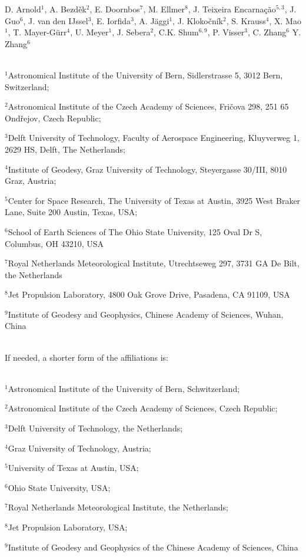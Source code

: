 \documentclass[11pt,a4paper,oneside]{article}
\begin{document}
D. Arnold$^1$, %
A. Bezd\v{e}k$^2$, %
E. Doornbos$^7$, %
M. Ellmer$^8$, %
J. Teixeira Encarna\c c\~ao$^{5,3}$, %
J. Guo$^6$, %
J. van den IJssel$^3$, %
E. Iorfida$^3$, %
A. J\"{a}ggi$^1$, %
J. Kloko\v{c}n\'{i}k$^2$, %
S. Krauss$^4$,
X. Mao$^1$, %
T. Mayer-G\"{u}rr$^4$, %
U. Meyer$^1$, %
J. Sebera$^2$, %
C.K. Shum$^{6,9}$, %
P. Visser$^3$, %
C. Zhang$^6$ %
Y. Zhang$^6$

~\\

$^1$Astronomical Institute of the University of Bern, Sidlerstrasse 5, 3012 Bern, Switzerland;

$^2$Astronomical Institute of the Czech Academy of Sciences, Fri\v{c}ova 298, 251 65 Ond\v{r}ejov, Czech Republic;

$^3$Delft University of Technology, Faculty of Aerospace Engineering, Kluyverweg 1, 2629 HS, Delft, The Netherlands;

$^4$Institute of Geodesy, Graz University of Technology, Steyergasse 30/III, 8010 Graz, Austria;

$^5$Center for Space Research, The University of Texas at Austin, 3925 West Braker Lane, Suite 200 Austin, Texas, USA;

$^6$School of Earth Sciences of The Ohio State University, 125 Oval Dr S, Columbus, OH 43210, USA

$^7$Royal Netherlands Meteorological Institute, Utrechtseweg 297, 3731 GA De Bilt, the Netherlands

$^8$Jet Propulsion Laboratory, 4800 Oak Grove Drive, Pasadena, CA 91109, USA

$^9$Institute of Geodesy and Geophysics, Chinese Academy of Sciences, Wuhan, China

~\\

If needed, a shorter form of the affiliations is:

~\\

$^1$Astronomical Institute of the University of Bern, Schwitzerland;

$^2$Astronomical Institute of the Czech Academy of Sciences, Czech Republic;

$^3$Delft University of Technology, the Netherlands;

$^4$Graz University of Technology, Austria;

$^5$University of Texas at Austin, USA;

$^6$Ohio State University, USA;

$^7$Royal Netherlands Meteorological Institute, the Netherlands;

$^8$Jet Propulsion Laboratory, USA;

$^9$Institute of Geodesy and Geophysics of the Chinese Academy of Sciences, China
\end{document}
